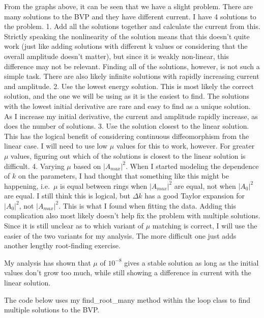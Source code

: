 \documentclass[11pt]{article}
\begin{document}
    From the graphs above, it can be seen that we have a slight problem.
There are many solutions to the BVP and they have different current. I
have 4 solutions to the problem. 1. Add all the solutions together and
calculate the current from this. Strictly speaking the nonlinearity of
the solution means that this doesn't quite work (just like adding
solutions with different k values or considering that the overall
amplitude doesn't matter), but since it is weakly non-linear, this
difference may not be relevant. Finding all of the solutions, however,
is not such a simple task. There are also likely infinite solutions with
rapidly increasing current and amplitude. 2. Use the lowest energy
solution. This is most likely the correct solution, and the one we will
be using as it is the easiest to find. The solutions with the lowest
initial derivative are rare and easy to find as a unique solution. As I
increase my initial derivative, the current and amplitude rapidly
increase, as does the number of solutions. 3. Use the solution closest
to the linear solution. This has the logical benefit of considering
continuous diffeomorphism from the linear case. I will need to use low
\(\mu\) values for this to work, however. For greater \(\mu\) values,
figuring out which of the solutions is closest to the linear solution is
difficult. 4. Varying \(\mu\) based on \(|A_{max}|^2\). When I started
modeling the dependence of \(k\) on the parameters, I had thought that
something like this might be happening, i.e.~\(\mu\) is equal between
rings when \(|A_{max}|^2\) are equal, not when \(|A_0|^2\) are equal. I
still think this is logical, but \(\Delta k\) has a good Taylor
expansion for \(|A_0|^2\), not \(|A_{max}|^2\). This is what I found
when fitting the data. Adding this complication also most likely doesn't
help fix the problem with multiple solutions. Since it is still unclear
as to which variant of \(\mu\) matching is correct, I will use the
easier of the two variants for my analysis. The more difficult one just
adds another lengthy root-finding exercise.

    My analysis has shown that \(\mu\) of \(10^{-8}\) gives a stable
solution as long as the initial values don't grow too much, while still
showing a difference in current with the linear solution.

    The code below uses my find\_root\_many method within the loop class to
find multiple solutions to the BVP.
\end{document}
